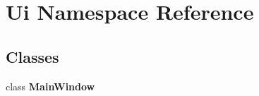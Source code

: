 \section{Ui Namespace Reference}
\label{namespace_ui}
\subsection*{Classes}
\begin{DoxyCompactItemize}
\item 
class \textbf{ Main\+Window}
\end{DoxyCompactItemize}
